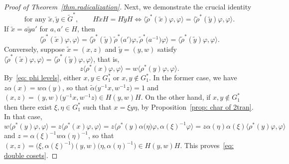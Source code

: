 \documentclass[11pt]{article}
\theoremstyle{definition}
\numberwithin{equation}{section}
\begin{document}
\begin{proof}[Proof of Theorem~\ref{thm.radicalization}]
Next, we demonstrate the crucial identity
\begin{equation}
\label{eq: double cosets}
\text{for any }\tilde{x},\tilde{y} \in \widetilde{G}^*,
\qquad
H\tilde{x}H = H\tilde{y}H \iff \langle \tilde{\rho}^*(\tilde{x}) \varphi, \varphi \rangle = \langle \tilde{\rho}^*(\tilde{y}) \varphi, \varphi \rangle.
\end{equation}
If $\tilde{x} = a \tilde{y} a'$ for $a,a' \in H$, then
\[ 
\langle \tilde{\rho}^*(\tilde{x}) \varphi, \varphi \rangle 
= \bigl\langle \tilde{\rho}^*(\tilde{y}) \tilde{\rho}^*\bigl(a'\bigr) \varphi, \tilde{\rho}^*\bigl(a^{-1}\bigr)\varphi \bigr\rangle 
= \langle \tilde{\rho}^*(\tilde{y}) \varphi, \varphi \rangle.
\]
Conversely, suppose $\tilde{x} = (x,z)$ and $\tilde{y} = (y,w)$ satisfy $\langle \tilde{\rho}^*(\tilde{x}) \varphi, \varphi \rangle = \langle \tilde{\rho}^*(\tilde{y}) \varphi, \varphi \rangle$, that is, 
\[ z \langle \rho^*(x) \varphi, \varphi \rangle = w \langle \rho^*(y) \varphi, \varphi \rangle. \] 
By~\eqref{eq: phi levels}, either $x,y \in G_1^*$ or $x,y \notin G_1^*$.
In the former case, we have $z \alpha(x) = w \alpha(y)$, so that $\widetilde{\alpha}\bigl(y^{-1}x,w^{-1} z\bigr) = 1$ and $(x,z) = (y,w)\bigl(y^{-1}x,w^{-1}z\bigr) \in H(y,w)H$.
On the other hand, if $x,y \notin G_1^*$ then there exist $\xi, \eta \in G_1^*$ such that $x = \xi y\eta$, by Proposition~\ref{prop: char of 2tran}.
In that case,
\[ 
w \langle \rho^*(y) \varphi, \varphi \rangle 
= z \langle \rho^*(x) \varphi, \varphi \rangle 
= z \bigl\langle \rho^*(y) \alpha\bigl(\eta \bigr) \varphi, \alpha(\xi)^{-1} \varphi \bigr\rangle 
= z \alpha(\eta) \alpha(\xi) \langle \rho^*(y) \varphi, \varphi \rangle
\]
and $z = \alpha(\xi)^{-1} w \alpha(\eta)^{-1}$, so that $(x,z) = \bigl(\xi,\alpha(\xi)^{-1}\bigr) (y,w) \bigl(\eta,\alpha(\eta)^{-1}\bigr) \in H(y,w)H$.
This proves~\eqref{eq: double cosets}.


\end{proof}
\end{document}
